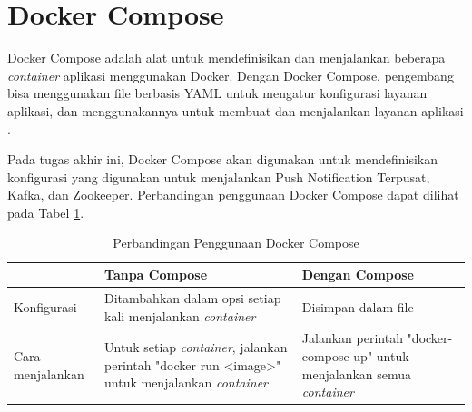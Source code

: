 \section{Docker Compose}
\par Docker Compose adalah alat untuk mendefinisikan dan menjalankan beberapa \textit{container} aplikasi menggunakan Docker. Dengan Docker Compose, pengembang bisa menggunakan file berbasis YAML untuk mengatur konfigurasi layanan aplikasi, dan menggunakannya untuk membuat dan menjalankan layanan aplikasi \cite{docker-compose-online}.
\par Pada tugas akhir ini, Docker Compose akan digunakan untuk mendefinisikan konfigurasi yang digunakan untuk menjalankan Push Notification Terpusat, Kafka, dan Zookeeper. Perbandingan penggunaan Docker Compose dapat dilihat pada Tabel \ref{t:perbandingan_docker_compose}.
\begin{longtable}{|p{2cm}|p{3.5cm}|p{3.5cm}|}
	\caption{Perbandingan Penggunaan Docker Compose} \label{t:perbandingan_docker_compose} \\ \hline
	\rowcolor{lightgray} & Tanpa Compose & Dengan Compose \\ \hline
	Konfigurasi & Ditambahkan dalam opsi setiap kali menjalankan \textit{container} & Disimpan dalam file \\ \hline
	Cara menjalankan & Untuk setiap \textit{container}, jalankan perintah "docker run <image>" untuk menjalankan \textit{container} & Jalankan perintah "docker-compose up" untuk menjalankan semua \textit{container} \\ \hline
\end{longtable}

